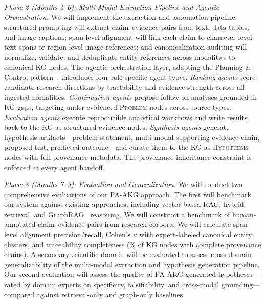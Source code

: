 \documentclass{files/proposalnsf}
\begin{document}
\textit{Phase 2 (Months 4--6): Multi-Modal Extraction Pipeline and Agentic Orchestration.}
We will implement the extraction and automation pipeline: structured prompting will extract claim--evidence pairs from text, data tables, and image captions; span-level alignment will link each claim to character-level text spans or region-level image references; and canonicalization auditing will normalize, validate, and deduplicate entity references across modalities to canonical KG nodes. The agentic orchestration layer, adapting the Planning \& Control pattern~\cite{Park2023GenerativeAgents}, introduces four role-specific agent types. \textit{Ranking agents} score candidate research directions by tractability and evidence strength across all ingested modalities. \textit{Continuation agents} propose follow-on analyses grounded in KG gaps, targeting under-evidenced \textsc{Problem} nodes across source types. \textit{Evaluation agents} execute reproducible analytical workflows and write results back to the KG as structured evidence nodes. \textit{Synthesis agents} generate hypothesis artifacts---problem statement, multi-modal supporting evidence chain, proposed test, predicted outcome---and curate them to the KG as \textsc{Hypothesis} nodes with full provenance metadata. The provenance inheritance constraint is enforced at every agent handoff.

\textit{Phase 3 (Months 7--9): Evaluation and Generalization.}
We will conduct two comprehensive evaluations of our PA-AKG approach. The first will benchmark our system against existing approaches, including vector-based RAG, hybrid retrieval, and GraphRAG~\cite{Edge2024GraphRAG} reasoning. We will construct a benchmark of human-annotated claim--evidence pairs from research corpora. We will calculate span-level alignment precision/recall, Cohen's $\kappa$ with expert-labeled canonical entity clusters, and traceability completeness (\ie \% of KG nodes with complete provenance chains). A secondary scientific domain will be evaluated to assess cross-domain generalizability of the multi-modal extraction and hypothesis generation pipeline. Our second evaluation will assess the quality of PA-AKG-generated hypotheses---rated by domain experts on specificity, falsifiability, and cross-modal grounding---compared against retrieval-only and graph-only baselines.
\end{document}
